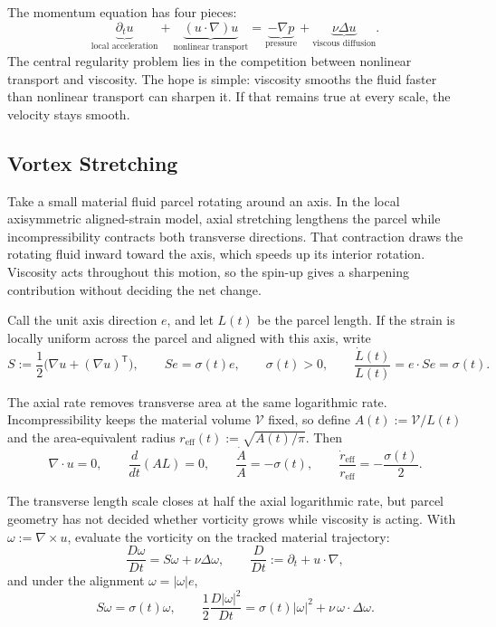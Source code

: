 
The momentum equation has four pieces:
\[
  \underbrace{\partial_t u}_{\text{local acceleration}}
  +
  \underbrace{(u\cdot\nabla)u}_{\text{nonlinear transport}}
  =
  \underbrace{-\nabla p}_{\text{pressure}}
  +
  \underbrace{\nu\Delta u}_{\text{viscous diffusion}}.
\]
The central regularity problem lies in the competition between nonlinear transport and viscosity.
The hope is simple: viscosity smooths the fluid faster than nonlinear transport can sharpen it.
If that remains true at every scale, the velocity stays smooth.

\subsection{Vortex Stretching}\label{sub:ThePerfectlyStretchingVortex}

Take a small material fluid parcel rotating around an axis. In the local axisymmetric aligned-strain model, axial stretching lengthens the parcel while incompressibility contracts both transverse directions. That contraction draws the rotating fluid inward toward the axis, which speeds up its interior rotation. Viscosity acts throughout this motion, so the spin-up gives a sharpening contribution without deciding the net change.

Call the unit axis direction \(e\), and let \(L(t)\) be the parcel length. If the strain is locally uniform across the parcel and aligned with this axis, write
\[
  S:=\frac12\bigl(\nabla u+(\nabla u)^{\mathsf T}\bigr),
  \qquad
  Se=\sigma(t)e,
  \qquad
  \sigma(t)>0,
  \qquad
  \frac{\dot L(t)}{L(t)}
  =
  e\cdot Se
  =
  \sigma(t).
\]

The axial rate removes transverse area at the same logarithmic rate. Incompressibility keeps the material volume \(\mathcal V\) fixed, so define \(A(t):=\mathcal V/L(t)\) and the area-equivalent radius \(r_{\mathrm{eff}}(t):=\sqrt{A(t)/\pi}\). Then
\[
  \nabla\cdot u=0,
  \qquad
  \frac{d}{dt}(A L)=0,
  \qquad
  \frac{\dot A}{A}=-\sigma(t),
  \qquad
  \frac{\dot r_{\mathrm{eff}}}{r_{\mathrm{eff}}}
  =
  -\frac{\sigma(t)}{2}.
\]

The transverse length scale closes at half the axial logarithmic rate, but parcel geometry has not decided whether vorticity grows while viscosity is acting. With \(\omega:=\nabla\times u\), evaluate the vorticity on the tracked material trajectory:
\[
  \frac{D\omega}{Dt}
  =
  S\omega+\nu\Delta\omega,
  \qquad
  \frac{D}{Dt}
  :=
  \partial_t+u\cdot\nabla,
\]
and under the alignment \(\omega=|\omega|e\),
\[
  S\omega
  =
  \sigma(t)\omega,
  \qquad
  \frac12\frac{D|\omega|^2}{Dt}
  =
  \sigma(t)|\omega|^2
  +
  \nu\,\omega\cdot\Delta\omega.
\]

